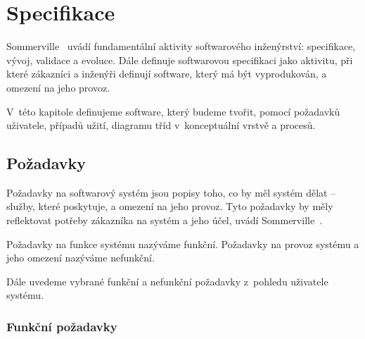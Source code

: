 \chapter{Specifikace}

Sommerville~\cite{sommerville_software_2011} uvádí fundamentální aktivity softwarového inženýrství: specifikace, vývoj, validace a evoluce.
Dále definuje softwarovou specifikaci jako aktivitu, při které zákazníci a inženýři definují software, který má být vyprodukován, a omezení na jeho provoz.

V~této kapitole definujeme software, který budeme tvořit, pomocí požadavků uživatele, případů užití, diagramu tříd v~konceptuální vrstvě a procesů.

\section{Požadavky}

Požadavky na softwarový systém jsou popisy toho, co by měl systém dělat -- služby, které poskytuje, a omezení na jeho provoz.
Tyto požadavky by měly reflektovat potřeby zákazníka na systém a jeho účel, uvádí Sommerville~\cite[s.~83]{sommerville_software_2011}.

Požadavky na funkce systému nazýváme funkční.
Požadavky na provoz systému a jeho omezení nazýváme nefunkční.

Dále uvedeme vybrané funkční a nefunkční požadavky z~pohledu uživatele systému.

\subsection{Funkční požadavky}

